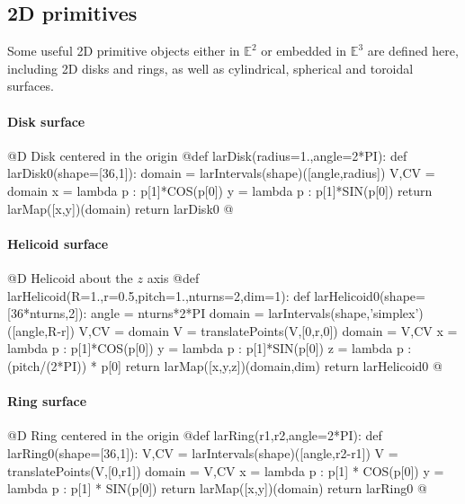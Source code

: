\documentclass[11pt,oneside]{article}	%
\def\E{\mathbb{E}}
\begin{document}
\subsection{2D primitives}
Some useful 2D primitive objects either in $\E^2$ or embedded in $\E^3$ are defined here, including 2D disks and rings, as well as cylindrical, spherical and toroidal surfaces.

\paragraph{Disk surface}
@D Disk centered in the origin
@{def larDisk(radius=1.,angle=2*PI):
	def larDisk0(shape=[36,1]):
		domain = larIntervals(shape)([angle,radius])
		V,CV = domain
		x = lambda p : p[1]*COS(p[0])
		y = lambda p : p[1]*SIN(p[0])
		return larMap([x,y])(domain)
	return larDisk0
@}
\paragraph{Helicoid surface}
@D Helicoid about the $z$ axis
@{def larHelicoid(R=1.,r=0.5,pitch=1.,nturns=2,dim=1):
	def larHelicoid0(shape=[36*nturns,2]):
		angle = nturns*2*PI
		domain = larIntervals(shape,'simplex')([angle,R-r])
		V,CV = domain
		V = translatePoints(V,[0,r,0])
		domain = V,CV
		x = lambda p : p[1]*COS(p[0])
		y = lambda p : p[1]*SIN(p[0])
		z = lambda p : (pitch/(2*PI)) * p[0]
		return larMap([x,y,z])(domain,dim)
	return larHelicoid0
@}

\paragraph{Ring surface}
@D Ring centered in the origin
@{def larRing(r1,r2,angle=2*PI):
	def larRing0(shape=[36,1]):
		V,CV = larIntervals(shape)([angle,r2-r1])
		V = translatePoints(V,[0,r1])
		domain = V,CV
		x = lambda p : p[1] * COS(p[0])
		y = lambda p : p[1] * SIN(p[0])
		return larMap([x,y])(domain)
	return larRing0
@}
\end{document}
